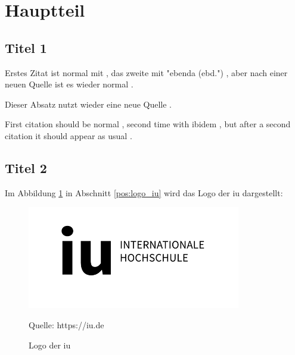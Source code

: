 \section{Hauptteil}

\lipsum[1]

\subsection{Titel 1}

Erstes Zitat ist normal mit \parencite[12]{sigfridsson}, das zweite mit "ebenda (ebd.") 
\parencite[78-79]{sigfridsson}, aber nach einer neuen Quelle \parencite[30]{geer} ist es wieder normal \parencite[20]{sigfridsson}.

Dieser Absatz nutzt wieder eine neue Quelle \parencite{nussbaum}.

First citation should be normal \parencite[11]{sigfridsson}, second time with ibidem
\parencite[95]{sigfridsson}, but after a second citation \parencite[282]{geer} it should appear as usual \parencite[2]{sigfridsson}.

\subsection{Titel 2}

Im Abbildung \ref*{fig:logo_iu} in Abschnitt \ref*{pos:logo_iu} wird das Logo der \ac{iu} dargestellt:

\begin{figure}[ht!]
    \label{pos:logo_iu}
    \includegraphics[scale=0.35]{logos/IU.png}
    \caption[Logo der \acs{iu}]{Logo der \ac{iu}}{Quelle: https://iu.de}
    \label{fig:logo_iu}
\end{figure}


\lipsum[7-8]